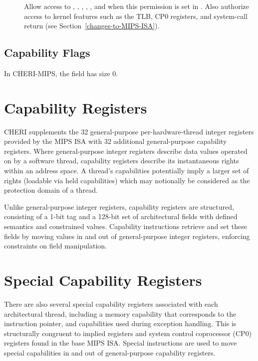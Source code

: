 \begin{description}
\item[\cappermASR{}] Allow access to \EPCC{}, \ErrorEPCC{}, \KDC{}, \KCC{},
\KRC{}, \KQC{} and \capcausereg{} when this permission is set in \PCC{}.
Also authorize access to kernel features such as the TLB, CP0 registers, and
system-call return (see Section~\ref{changes-to-MIPS-ISA}).
\end{description}

\subsection{Capability Flags}

In CHERI-MIPS, the \cflags{} field has size 0.

\section{Capability Registers}

CHERI supplements the 32 general-purpose per-hardware-thread integer registers
provided by the MIPS ISA with 32 additional general-purpose capability
registers.
Where general-purpose integer registers describe data values operated on by a
software thread, capability registers describe its instantaneous rights within
an address space.
A thread's capabilities potentially imply a larger set of rights (loadable via
held capabilities) which may notionally be considered as the protection domain
of a thread.

Unlike general-purpose integer registers, capability registers are structured,
consisting of a 1-bit tag and a 128-bit set of architectural fields
with defined semantics and constrained values.
Capability instructions retrieve and set these fields by moving values in and
out of general-purpose integer registers, enforcing constraints on field manipulation.

\section{Special Capability Registers}

There are also several special capability registers associated with each
architectural thread, including a memory capability that corresponds to the
instruction pointer, and capabilities used during exception handling.
This is structurally congruent to implied registers and system control
coprocessor (CP0) registers found in the base MIPS ISA.
Special instructions are used to move special capabilities in and out of
general-purpose capability registers.

